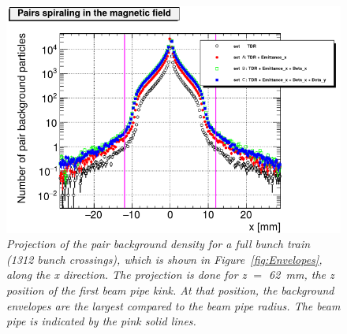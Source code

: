 \begin{figure}
\centering
\includegraphics[width=\textwidth]{figures/HelixEnvelope_Projection_Comparison_250GeV_parametersets_NEWSETNAMES.png}
\caption{\textit{Projection of the pair background density for a full bunch train (1312 bunch crossings), which is shown in Figure~\ref{fig:Envelopes}, along the x direction.
The projection is done for z $=$ \SI{62}{\milli\meter}, the z position of the first beam pipe kink.
At that position, the background envelopes are the largest compared to the beam pipe radius.
The beam pipe is indicated by the pink solid lines.}}
\label{fig:Projection_Envelopes}
\end{figure}

